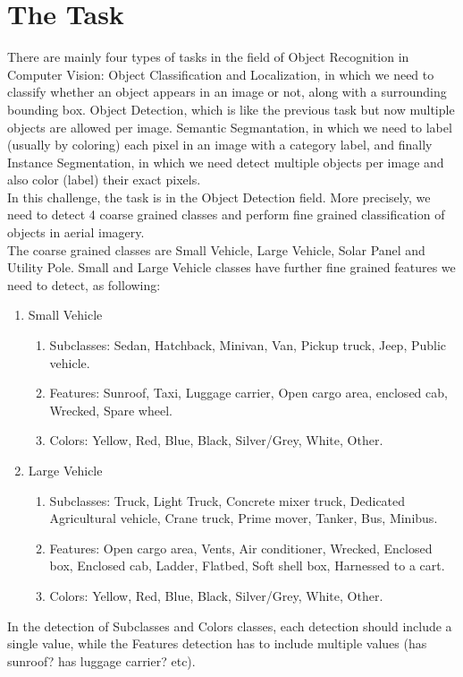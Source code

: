 \documentclass[]{article}
\begin{document}
\section{The Task}
There are mainly four types of tasks in the field of Object Recognition in Computer Vision: Object Classification and Localization, in which we need to classify whether an object appears in an image or not, along with a surrounding bounding box. Object Detection, which is like the previous task but now multiple objects are allowed per image. Semantic Segmantation, in which we need to label (usually by coloring) each pixel in an image with a category label, and finally Instance Segmentation, in which we need detect multiple objects per image and also color (label) their exact pixels.\\
In this challenge, the task is in the Object Detection field. More precisely, we need to detect 4 coarse grained classes and perform fine grained classification of objects in aerial imagery.\\
The coarse grained classes are Small Vehicle, Large Vehicle, Solar Panel and Utility Pole. Small and Large Vehicle classes have further fine grained features we need to detect, as following:\\
\clearpage
\begin{enumerate}
\item Small Vehicle
	\begin{enumerate}
		\item Subclasses: Sedan, Hatchback, Minivan, Van, Pickup truck, Jeep, Public vehicle.
		\item Features: Sunroof, Taxi, Luggage carrier, Open cargo area, enclosed cab, Wrecked, Spare wheel.
		\item Colors: Yellow, Red, Blue, Black, Silver/Grey, White, Other.
	\end{enumerate}
\item Large Vehicle
	\begin{enumerate}
	\item Subclasses: Truck, Light Truck, Concrete mixer truck, Dedicated Agricultural vehicle, Crane truck, Prime mover, Tanker, Bus, Minibus.
	\item Features: Open cargo area, Vents, Air conditioner, Wrecked, Enclosed box, Enclosed cab, Ladder, Flatbed, Soft shell box, Harnessed to a cart.
	\item Colors: Yellow, Red, Blue, Black, Silver/Grey, White, Other.
	\end{enumerate}
\end{enumerate}
In the detection of Subclasses and Colors classes, each detection should include a single value, while the Features detection has to include multiple values (has sunroof? has luggage carrier? etc).
\end{document}
